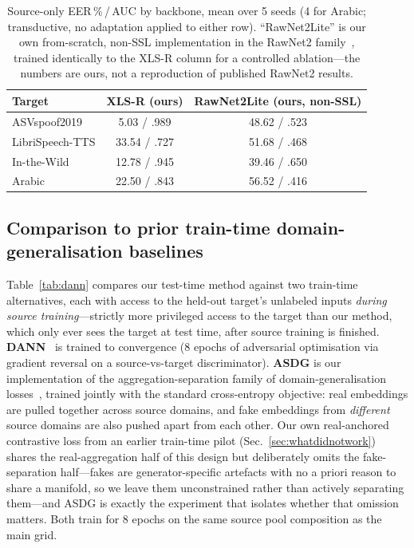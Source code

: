 \documentclass[conference]{IEEEtran}
\begin{document}
\begin{table}[t]
\centering
\caption{Source-only EER\,\%\,/\,AUC by backbone, mean over 5 seeds (4 for
Arabic; transductive, no adaptation applied to either row). ``RawNet2Lite'' is
our own from-scratch, non-SSL implementation in the RawNet2
family~\cite{rawnet2}, trained identically to the XLS-R column for a controlled
ablation---the numbers are ours, not a reproduction of published RawNet2
results.}
\label{tab:backbone}
\begin{tabular}{@{}lcc@{}}
\toprule
Target & XLS-R (ours) & RawNet2Lite (ours, non-SSL) \\
\midrule
ASVspoof2019 & 5.03 / .989 & 48.62 / .523 \\
LibriSpeech-TTS & 33.54 / .727 & 51.68 / .468 \\
In-the-Wild & 12.78 / .945 & 39.46 / .650 \\
Arabic & 22.50 / .843 & 56.52 / .416 \\
\bottomrule
\end{tabular}
\end{table}

\subsection{Comparison to prior train-time domain-generalisation baselines}
\label{sec:dann}
Table~\ref{tab:dann} compares our test-time method against two train-time
alternatives, each with access to the held-out target's unlabeled inputs
\emph{during source training}---strictly more privileged access to the target
than our method, which only ever sees the target at test time, after source
training is finished. \textbf{DANN}~\cite{dann} is trained to convergence (8
epochs of adversarial optimisation via gradient reversal on a source-vs-target
discriminator). \textbf{ASDG} is our implementation of the aggregation-separation
family of domain-generalisation losses~\cite{asdg}, trained jointly with the
standard cross-entropy objective: real embeddings are pulled together across
source domains, and fake embeddings from \emph{different} source domains are
also pushed apart from each other. Our own real-anchored contrastive loss from
an earlier train-time pilot (Sec.~\ref{sec:whatdidnotwork}) shares the
real-aggregation half of this design but deliberately omits the fake-separation
half---fakes are generator-specific artefacts with no a priori reason to share
a manifold, so we leave them unconstrained rather than actively separating
them---and ASDG is exactly the experiment that isolates whether that omission
matters. Both train for 8 epochs on the same source pool composition as the
main grid.
\end{document}
